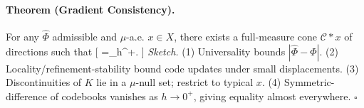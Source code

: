 \documentclass[aps,preprint,onecolumn,longbibliography,nofootinbib]{revtex4-2}
\numberwithin{equation}{section}
\begin{document}
\paragraph*{Theorem (Gradient Consistency).} For any $\widehat\Phi$ admissible and $\mu$-a.e. $x\in X$, there exists a full-measure cone $\mathcal{C}*x$ of directions such that
[
=\lim_{h^+}.
]
\emph{Sketch.} (1) Universality bounds $|\widehat\Phi-\Phi|$. (2) Locality/refinement-stability bound code updates under small displacements. (3) Discontinuities of $K$ lie in a $\mu$-null set; restrict to typical $x$. (4) Symmetric-difference of codebooks vanishes as $h\to0^+$, giving equality almost everywhere. \hfill$\square$

\end{document}
